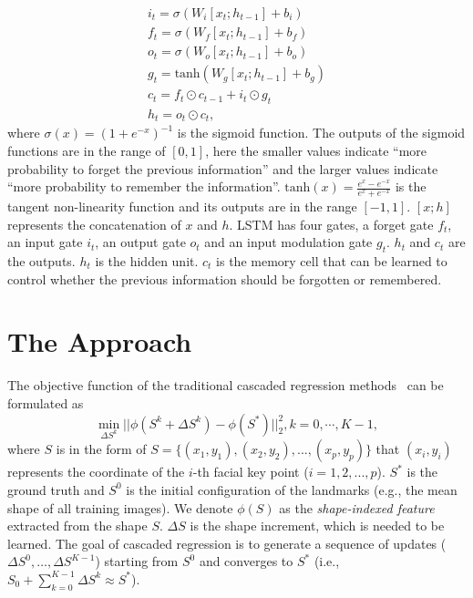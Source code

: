 \documentclass[journal]{IEEEtran}
\begin{document}
\begin{equation}
\nonumber
\begin{aligned}
 &i_t = \sigma(W_i[x_t;h_{t-1}] + b_i)& \\
 &f_t = \sigma(W_f[x_t;h_{t-1}] + b_f)& \\
 &o_t = \sigma(W_o[x_t;h_{t-1}] + b_o)& \\
 &g_t = \text{tanh}(W_g[x_t;h_{t-1}] + b_g)&\\
 &c_t = f_t \odot c_{t-1} + i_t \odot g_t&\\
 &h_t = o_t \odot c_t,&
\end{aligned}
\end{equation}
where $\sigma(x) = (1+e^{-x})^{-1}$ is the sigmoid function. The outputs of the sigmoid functions are in the range of $[0,1]$, here the smaller values indicate ``more probability to forget the previous information'' and the larger values indicate ``more probability to remember the information''. $\text{tanh}(x) = \frac{e^x - e^{-x}}{e^x + e^{-x}}$ is the tangent non-linearity function and its outputs are in the range $[-1,1]$. $[x;h]$ represents the concatenation of $x$ and $h$. LSTM has four gates, a forget gate $f_t$, an input gate $i_t$, an output gate $o_t$ and an input modulation gate $g_t$. $h_t$ and $c_t$ are the outputs. $h_t$ is the hidden unit. $c_t$ is the memory cell that can be learned to control whether the previous information should be forgotten or remembered.


\section{The Approach}
\label{approach}


The objective function of the traditional cascaded regression methods~\cite{sdm} can be formulated as
\begin{equation}
 \min_{\Delta S^k} ||\phi(S^k + \Delta S^k) - \phi(S^*) ||_2^2, k = 0,\cdots,K-1,
\label{cascade_formulation}
\end{equation}
where $S$ is in the form of $S = \{(x_1,y_1),(x_2,y_2),...,(x_p,y_p)\}$ that $(x_i,y_i)$ represents the coordinate of the $i$-th facial key point ($i=1,2,...,p$). $S^{*}$ is the ground truth and $S^0$ is the initial configuration of the landmarks (e.g., the mean shape of all training images). We denote $\phi(S)$ as the \textit{shape-indexed feature} extracted from the shape $S$. $\Delta S$ is the shape increment, which is needed to be learned. The goal of cascaded regression is to generate a sequence of updates ($\Delta S^{0}, \ldots, \Delta S^{K-1}$) starting from $S^0$ and converges to $S^{*}$ (i.e., $S_0 + \sum_{k=0}^{K-1} \Delta S^k \approx S^{*}$).
\end{document}
